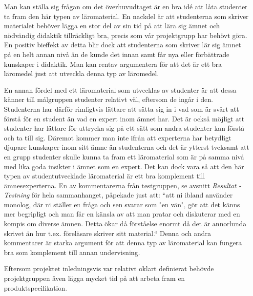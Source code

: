 \documentclass[]{article}
\begin{document}
Man kan ställa sig frågan om det överhuvudtaget är en bra idé att
låta studenter ta fram den här typen av läromaterial. En nackdel 
är att studenterna som skriver materialet behöver lägga en stor 
del av sin tid på att lära sig ämnet och nödvändig didaktik 
tillräckligt bra, precis som vår projektgrupp har behövt göra. 
En positiv bieffekt av detta blir dock att studenterna som skriver 
lär sig ämnet på en helt annan nivå än de kunde det innan 
samt får nya eller förbättrade kunskaper i didaktik. Man kan 
rentav argumentera för att det är ett bra läromedel just att 
utveckla denna typ av läromedel.

En annan fördel med ett läromaterial som utvecklas av studenter
är att dessa känner till målgruppen studenter relativt väl, 
eftersom de ingår i den. Studenterna har därför rimligtvis lättare 
att sätta sig in i vad som är svårt att förstå för en student
än vad en expert inom ämnet har. Det är också möjligt att studenter
har lättare för uttrycka sig på ett sätt som andra studenter  
kan förstå och ta till sig. Däremot kommer man inte ifrån 
att experterna har betydligt djupare kunskaper inom sitt ämne
än studenterna och det är ytterst tveksamt att en grupp studenter
skulle kunna ta fram ett läromaterial som är på samma nivå med 
lika goda insikter i ämnet som en expert. Det kan dock vara så
att den här typen av studentutvecklade läromaterial är ett bra
komplement till ämnesexperterna. En av kommentarerna från 
testgruppen, se avsnitt \textit{Resultat - Testning} för hela sammanhanget,
påpekade just att: “att ni ibland använder monolog, där ni 
ställer en fråga och sen svarar som "en vän", gör
att det känns mer begripligt och man får en känsla av att man 
pratar och diskuterar med en kompis om diverse ämnen. Detta 
ökar då förståelse enormt då det är annorlunda skrivet än hur 
t.ex. föreläsare skriver sitt material.“ Denna och andra 
kommentarer är starka argument för att denna typ av 
läromaterial kan fungera bra som komplement till annan
undervisning.

Eftersom projektet inledningsvis var relativt oklart definierat
behövde projektgruppen även lägga mycket tid på att arbeta fram en
produktspecifikation.

\end{document}
